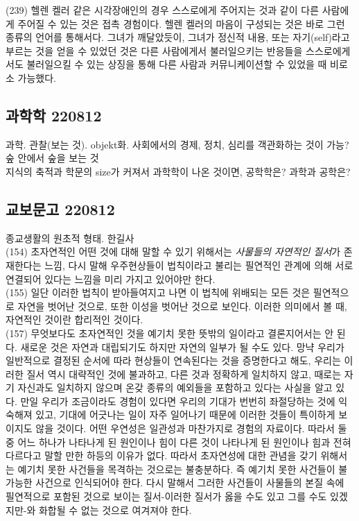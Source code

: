 \documentclass[11pt, a4paper]{article}
\begin{document}
(239) 헬렌 켈러 같은 시각장애인의 경우 스스로에게 주어지는 것과 같이 다른 사람에게 주어질 수 있는 것은 접촉 경험이다. 헬렌 켈러의 마음이 구성되는 것은 바로 그런 종류의 언어를 통해서다. 그녀가 깨달았듯이, 그녀가 정신적 내용, 또는 자기(self)라고 부르는 것을 얻을 수 있었던 것은 다른 사람에게서 불러일으키는 반응들을 스스로에게서도 불러일으킬 수 있는 상징을 통해 다른 사람과 커뮤니케이션할 수 있었을 때 비로소 가능했다. 




\newpage
\subsection{과학학 220812}
과학. 관찰(보는 것). objekt화. 사회에서의 경제, 정치, 심리를 객관화하는 것이 가능? 숲 안에서 숲을 보는 것 \\

지식의 축적과 학문의 size가 커져서 과학학이 나온 것이면, 공학학은? 과학과 공학은? \\


\newpage
\subsection{교보문고 220812}

종교생활의 원초적 형태. 한길사 \\
(154) 초자연적인 어떤 것에 대해 말할 수 있기 위해서는 \emph{사물들의 자연적인 질서}가 존재한다는 느낌, 다시 말해 우주현상들이 법칙이라고 불리는 필연적인 관계에 의해 서로 연결되어 있다는 느낌을 미리 가지고 있어야만 한다.  \\
(155) 일단 이러한 법칙이 받아들여지고 나면 이 법칙에 위배되는 모든 것은 필연적으로 자연을 벗어난 것으로, 또한 이성을 벗어난 것으로 보인다. 이러한 의미에서 볼 때, 자연적인 것이란 합리적인 것이다. \\
(157) 무엇보다도 초자연적인 것을 예기치 못한 뜻밖의 일이라고 결론지어서는 안 된다. 새로운 것은 자연과 대립되기도 하지만 자연의 일부가 될 수도 있다. 망냑 우리가 일반적으로 결정된 순서에 따라 현상들이 연속된다는 것을 증명한다고 해도, 우리는 이러한 질서 역시 대략적인 것에 불과하고, 다른 것과 정확하게 일치하지 않고, 때로는 자기 자신과도 일치하지 않으며 온갖 종류의 예외들을 포함하고 있다는 사실을 알고 있다. 만일 우리가 조금이라도 경험이 있다면 우리의 기대가 번번히 좌절당하는 것에 익숙해져 있고, 기대에 어긋나는 일이 자주 일어나기 때문에 이러한 것들이 특이하게 보이지도 않을 것이다. 어떤 우연성은 일관성과 마찬가지로 경험의 자료이다. 따라서 둘 중 어느 하나가 나타나게 된 원인이나 힘이 다른 것이 나타나게 된 원인이나 힘과 전혀 다르다고 말할 만한 하등의 이유가 없다. 따라서 초자연성에 대한 관념을 갖기 위해서는 예기치 못한 사건들을 목격하는 것으로는 불충분하다. 즉 예기치 못한 사건들이 불가능한 사건으로 인식되어야 한다. 다시 말해서 그러한 사건들이 사물들의 본질 속에 필연적으로 포함된 것으로 보이는 질서-이러한 질서가 옳을 수도 있고 그를 수도 있겠지만-와 화합될 수 없는 것으로 여겨져야 한다. \\
\end{document}
